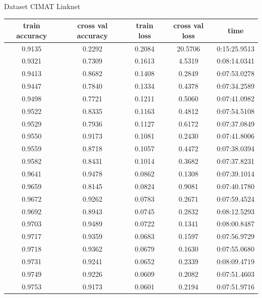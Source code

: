 \begin{frame}{Dataset CIMAT}
    \tiny
    Linknet
    \centering
    \begin{tabular}{c|c|c|c|c}
         \hline        train accuracy&cross val accuracy&train loss&cross val loss&time\\
         \hline
0.9135&0.2292&0.2084&20.5706&0:15:25.9513  \\
0.9321&0.7309&0.1613&4.5319&0:08:14.0341  \\
0.9413&0.8682&0.1408&0.2849&0:07:53.0278  \\
0.9447&0.7840&0.1334&0.4378&0:07:34.2589  \\
0.9498&0.7721&0.1211&0.5060&0:07:41.0982  \\
0.9522&0.8335&0.1163&0.4812&0:07:54.5108  \\
0.9529&0.7936&0.1127&0.6172&0:07:37.0849  \\
0.9550&0.9173&0.1081&0.2430&0:07:41.8006  \\
0.9559&0.8718&0.1057&0.4472&0:07:38.0394  \\
0.9582&0.8431&0.1014&0.3682&0:07:37.8231  \\
0.9641&0.9478&0.0862&0.1308&0:07:39.1014  \\
0.9659&0.8145&0.0824&0.9081&0:07:40.1780  \\
0.9672&0.9262&0.0783&0.2671&0:07:59.4524  \\
0.9692&0.8943&0.0745&0.2832&0:08:12.5293  \\
0.9703&0.9489&0.0722&0.1341&0:08:00.8487  \\
0.9717&0.9359&0.0683&0.1597&0:07:56.9729  \\
0.9718&0.9362&0.0679&0.1630&0:07:55.0680  \\
0.9731&0.9241&0.0652&0.2339&0:08:09.4719  \\
0.9749&0.9226&0.0609&0.2082&0:07:51.4603  \\
0.9753&0.9173&0.0601&0.2194&0:07:51.9716  \\
    \hline
    \end{tabular}
\end{frame}


